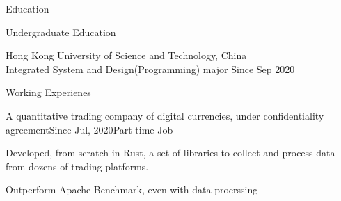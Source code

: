 \documentclass[UTF8]{resume} %
\begin{document}
\begin{rSection}{Education}

    \begin{rSubsection}{Undergraduate Education}{}{}{} 
        \item Hong Kong University of Science and Technology, China \\ Integrated System and Design(Programming) major \hfill Since Sep 2020
    \end{rSubsection}
\end{rSection}
\begin{rSection}{Working Experienes}
    \begin{rSubsection}{A quantitative trading company of digital currencies, under confidentiality agreement}{Since Jul, 2020}{Part-time Job}{}
        \item Developed, from scratch in Rust, a set of libraries to collect and process data from dozens of trading platforms.
        \item Outperform Apache Benchmark, even with data procrssing
\end{rSubsection}

\end{rSection}
\end{document}
